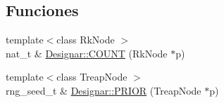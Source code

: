 \subsection*{Funciones}
\begin{DoxyCompactItemize}
\item 
{\footnotesize template$<$class Rk\+Node $>$ }\\nat\+\_\+t \& \hyperlink{namespace_designar_a473e1d283b3fd0a75ec0c645eeb7818d}{Designar\+::\+C\+O\+U\+NT} (Rk\+Node $\ast$p)
\item 
{\footnotesize template$<$class Treap\+Node $>$ }\\rng\+\_\+seed\+\_\+t \& \hyperlink{namespace_designar_a0189c4d8fbe8db0c8189d80989a4e9ca}{Designar\+::\+P\+R\+I\+OR} (Treap\+Node $\ast$p)
\end{DoxyCompactItemize}
